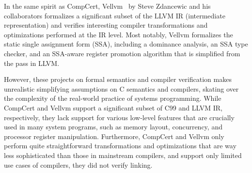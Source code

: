 
In the same spirit as CompCert, Vellvm~\cite{vellvm} by Steve Zdancewic and his collaborators
formalizes a significant subset of the LLVM IR (intermediate representation) and verifies
interesting compiler transformations and optimizations performed at the IR level.  Most notably,
Vellvm formalizes the static single assignment form (SSA), including a dominance analysis, an SSA
type checker, and an SSA-aware register promotion algorithm that is simplified from the
 pass in LLVM.


However, these projects on formal semantics and compiler verification makes unrealistic simplifying
assumptions on C semantics and compilers, skating over the complexity of the real-world practice of
systems programming.  While CompCert and Vellvm support a significant subset of C99 and LLVM IR,
respectively, they lack support for various low-level features that are crucially used in many
system programs, such as memory layout, concurrency, and processor register manipulation.
Furthermore, CompCert and Vellvm only perform quite straightforward transformations and
optimizations that are way less sophisticated than those in mainstream compilers, and support only
limited use cases of compilers, \eg{} they did not verify linking.


